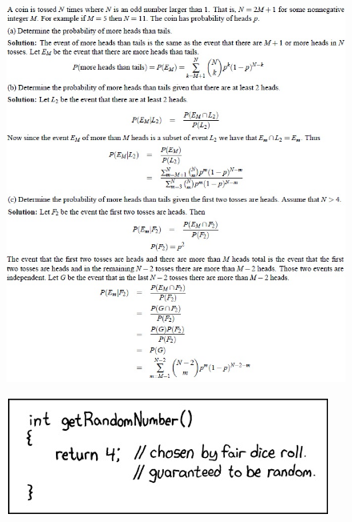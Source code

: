 \documentclass[11pt,landscape]{article}
\begin{document}
\begin{multicols}{3}
\begin{figure}[H]
    \includegraphics[scale=0.46]{./Images/Cointoss.jpg}
\end{figure}
\begin{figure}[H]
    \includegraphics[scale=0.8]{./Images/RandNumXKCD.jpg}
\end{figure}
\end{multicols}
\end{document}
